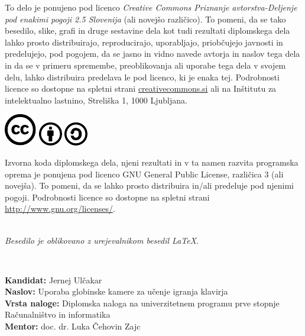 \documentclass[a4paper,12pt,openright]{book}
\newcommand{\clearemptydoublepage}{\newpage{\pagestyle{empty}\cleardoublepage}}
\newcommand{\CcImageCc}[1]{%
	\includegraphics[scale=#1]{cc_cc_30.pdf}%
}
\newcommand{\CcImageBy}[1]{%
	\includegraphics[scale=#1]{cc_by_30.pdf}%
}
\newcommand{\CcImageSa}[1]{%
	\includegraphics[scale=#1]{cc_sa_30.pdf}%
}
\begin{document}
\newpage
\thispagestyle{empty}

\vspace*{5cm}
{\small \noindent
To delo je ponujeno pod licenco \textit{Creative Commons Priznanje avtorstva-Deljenje pod enakimi pogoji 2.5 Slovenija} (ali novej\v so razli\v cico).
To pomeni, da se tako besedilo, slike, grafi in druge sestavine dela kot tudi rezultati diplomskega dela lahko prosto distribuirajo,
reproducirajo, uporabljajo, priobčujejo javnosti in predelujejo, pod pogojem, da se jasno in vidno navede avtorja in naslov tega
dela in da se v primeru spremembe, preoblikovanja ali uporabe tega dela v svojem delu, lahko distribuira predelava le pod
licenco, ki je enaka tej.
Podrobnosti licence so dostopne na spletni strani \href{http://creativecommons.si}{creativecommons.si} ali na Inštitutu za
intelektualno lastnino, Streliška 1, 1000 Ljubljana.

\vspace*{1cm}
\begin{center}%
\CcImageCc{0.741573033707865}\hspace*{1ex}\CcImageBy{1}\hspace*{1ex}\CcImageSa{1}%
\end{center}
}

\vspace*{1cm}
{\small \noindent
Izvorna koda diplomskega dela, njeni rezultati in v ta namen razvita programska oprema je ponujena pod licenco GNU General Public License,
različica 3 (ali novejša). To pomeni, da se lahko prosto distribuira in/ali predeluje pod njenimi pogoji.
Podrobnosti licence so dostopne na spletni strani \url{http://www.gnu.org/licenses/}.
}

\vfill
\begin{center} 
\ \\ \vfill
{\em
Besedilo je oblikovano z urejevalnikom besedil \LaTeX.}
\end{center}

\clearemptydoublepage

\thispagestyle{empty}
\
\vfill

\bigskip
\noindent\textbf{Kandidat:} Jernej Ulčakar\\
\noindent\textbf{Naslov:} Uporaba globinske kamere za učenje igranja klavirja\\
\noindent\textbf{Vrsta naloge:} Diplomska naloga na univerzitetnem programu prve stopnje Računalništvo in informatika \\
\noindent\textbf{Mentor:} doc. dr. Luka Čehovin Zajc\\
\end{document}
